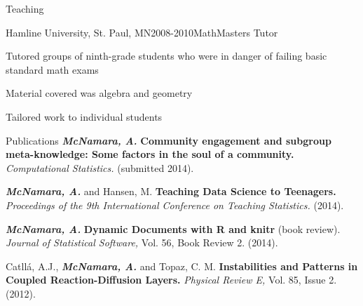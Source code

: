 \documentclass{resume} %
\begin{document}
\begin{rSection}{Teaching}
\begin{rSubsection}{Hamline University, }{St. Paul, MN}{2008-2010}{MathMasters Tutor}
\item Tutored groups of ninth-grade students who were in danger of failing basic standard math exams
\item Material covered was algebra and geometry
\item Tailored work to individual students
\end{rSubsection}

\end{rSection}



\begin{rSection}{Publications}
{\bf \em McNamara, A.} {\bf Community engagement and subgroup meta-knowledge: Some factors in the soul of a community.} { \em Computational Statistics.} (submitted 2014).

{\bf \em McNamara, A. }and Hansen, M. {\bf Teaching Data Science to Teenagers.}{ \em Proceedings of the 9th International Conference on Teaching Statistics.} (2014). 

{\bf \em McNamara, A. }{\bf Dynamic Documents with R and knitr} (book review). {\em Journal of Statistical Software,}{ Vol. 56, Book Review 2.} (2014).

{Catll{\'a}, A.J., {\bf \em McNamara, A.} and Topaz, C. M.} {\bf Instabilities and Patterns in Coupled Reaction-Diffusion Layers.} {\em Physical Review E,} Vol. 85, Issue 2. (2012). 

\end{rSection}
\end{document}
